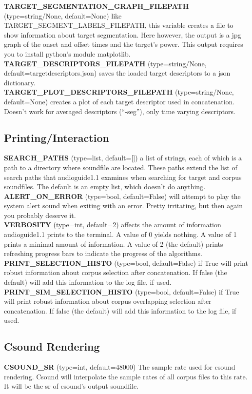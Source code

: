 \documentclass{article}
\newcommand{\optEntry}[4]{\textbf{#1} (type=#2, default=#3) #4\hspace{0.5em}\\}
\newcommand{\ag}{audioguide1.1 }
\begin{document}
\begin{spacing}{1.2}
\optEntry{TARGET\_SEGMENTATION\_GRAPH\_FILEPATH}{string/None}{None}{like TARGET\_SEGMENT\_LABELS\_FILEPATH, this variable creates a file to show information about target segmentation.  Here however, the output is a jpg graph of the onset and offset times and the target's power.  This output requires you to install python's module matplotlib.}

\optEntry{TARGET\_DESCRIPTORS\_FILEPATH}{string/None}{targetdescriptors.json}{saves the loaded target descriptors to a json dictionary.}

\optEntry{TARGET\_PLOT\_DESCRIPTORS\_FILEPATH}{string/None}{None}{creates a plot of each target descriptor used in concatenation.  Doesn't work for averaged descriptors (``-seg''), only time varying descriptors.}



\subsection{Printing/Interaction}
\optEntry{SEARCH\_PATHS}{list}{[]}{a list of strings, each of which is a path to a directory where soundfile are located.  These paths extend the list of search paths that \ag examines when searching for target and corpus soundfiles.  The default is an empty list, which doesn't do anything.}

\optEntry{ALERT\_ON\_ERROR}{bool}{False}{will attempt to play the system alert sound when exiting with an error.  Pretty irritating, but then again you probably deserve it.}

\optEntry{VERBOSITY}{int}{2}{affects the amount of information \ag prints to the terminal.  A value of 0 yields nothing.  A value of 1 prints a minimal amount of information.  A value of 2 (the default) prints refreshing progress bars to indicate the progress of the algorithms.}

\optEntry{PRINT\_SELECTION\_HISTO}{bool}{False}{if True will print robust information about corpus selection after concatenation.  If false (the default) will add this information to the log file, if used.}

\optEntry{PRINT\_SIM\_SELECTION\_HISTO}{bool}{False}{if True will print robust information about corpus overlapping selection after concatenation.  If false (the default) will add this information to the log file, if used.}


\subsection{Csound Rendering}
\optEntry{CSOUND\_SR}{int}{48000}{The sample rate used for csound rendering.  Csound will interpolate the sample rates of all corpus files to this rate.  It will be the sr of csound's output soundfile.}


\end{spacing}
\end{document}
